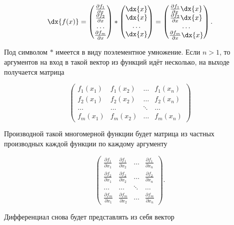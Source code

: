\begin{sol}
\begin{enumerate}
\[
\dx{f(x)} = \begin{pmatrix} \frac{\partial f_1}{\partial x} \\ \frac{\partial f_2}{\partial x} \\ \ldots  \\ \frac{\partial f_m}{\partial x} \end{pmatrix} * \begin{pmatrix} \dx{x} \\ \dx{x} \\ \ldots  \\ \dx{x} \end{pmatrix}  = \begin{pmatrix} \frac{\partial f_1}{\partial x} \dx{x} \\ \frac{\partial f_2}{\partial x} \dx{x} \\ \ldots  \\ \frac{\partial f_m}{\partial x} \dx{x} \end{pmatrix}.
\]

Под символом $*$ имеется в виду поэлементное умножение. Если $n > 1$, то аргументов на вход в такой вектор из функций идёт несколько, на выходе получается матрица 

\[
\begin{pmatrix} f_1(x_1) & f_1(x_2) & \ldots & f_1(x_n) \\ f_2(x_1)  & f_2(x_2) & \ldots & f_2(x_n)  \\ \ldots & \ldots & \ddots & \ldots  \\ f_m(x_1)  & f_m(x_2) & \ldots & f_m(x_n) \end{pmatrix}
\]

Производной такой многомерной функции будет матрица из частных производных каждой функции по каждому аргументу

\[
\begin{pmatrix} \frac{\partial f_1}{\partial x_1} & \frac{\partial f_1}{\partial x_2} & \ldots & \frac{\partial f_1}{\partial x_n} \\ \frac{\partial f_2}{\partial x_1}  & \frac{\partial f_2}{\partial x_2} & \ldots & \frac{\partial f_2}{\partial x_n}  \\ \ldots & \ldots & \ddots & \ldots  \\ \frac{\partial f_m}{\partial x_1}  & \frac{\partial f_m}{\partial x_2} & \ldots & \frac{\partial f_m}{\partial x_n} \end{pmatrix}.
\]

Дифференциал снова будет представлять из себя вектор


\end{enumerate}
\end{sol}
